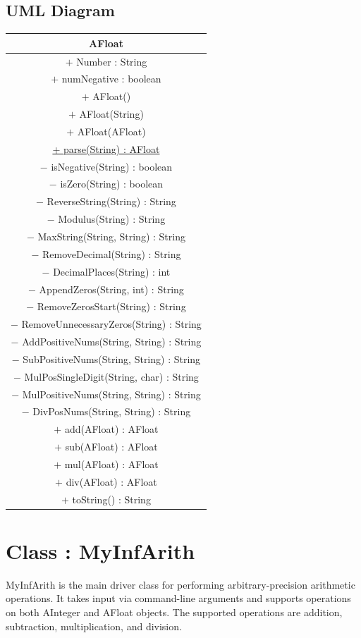 \documentclass{article}
\begin{document}
\subsection*{UML Diagram}
\begin{table}[H]
\centering
\begin{tabular}{|c|}
\hline
\textbf{AFloat} \\
\hline
\(+\) Number : String \\
\(+\) numNegative : boolean \\
\hline
\(+\) AFloat() \\
\(+\) AFloat(String) \\
\(+\) AFloat(AFloat) \\
\underline{+ parse(String) : AFloat} \\
\(-\) isNegative(String) : boolean \\
\(-\) isZero(String) : boolean \\
\(-\) ReverseString(String) : String \\
\(-\) Modulus(String) : String \\
\(-\) MaxString(String, String) : String \\
\(-\) RemoveDecimal(String) : String \\
\(-\) DecimalPlaces(String) : int \\
\(-\) AppendZeros(String, int) : String \\
\(-\) RemoveZerosStart(String) : String \\
\(-\) RemoveUnnecessaryZeros(String) : String \\
\(-\) AddPositiveNums(String, String) : String \\
\(-\) SubPositiveNums(String, String) : String \\
\(-\) MulPosSingleDigit(String, char) : String \\
\(-\) MulPositiveNums(String, String) : String \\
\(-\) DivPosNums(String, String) : String \\
\(+\) add(AFloat) : AFloat \\
\(+\) sub(AFloat) : AFloat \\
\(+\) mul(AFloat) : AFloat \\
\(+\) div(AFloat) : AFloat \\
\(+\) toString() : String \\
\hline
\end{tabular}
\end{table}
\newpage

\section{Class : {MyInfArith}}
MyInfArith is the main driver class for performing arbitrary-precision arithmetic operations. It takes input via command-line arguments and supports operations on both AInteger and AFloat objects. The supported operations are addition, subtraction, multiplication, and division.
\end{document}

